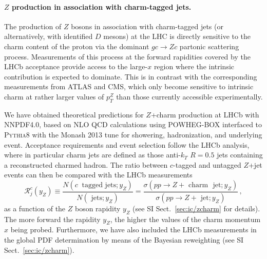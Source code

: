 \paragraph{$Z$ production in association with charm-tagged jets.}
%
The production of $Z$ bosons in association with charm-tagged jets (or alternatively,
with identified $D$ mesons) at the LHC is directly sensitive to the charm content
of the proton via the dominant $gc \to Zc$ partonic scattering process.
%
Measurements of this process at  the forward rapidities covered by the
LHCb acceptance provide access to the large-$x$ region where the intrinsic 
contribution is expected to dominate.
%
This is in contrast with the corresponding measurements from ATLAS and CMS,
which only become sensitive to intrinsic charm
at rather larger values of $p_T^Z$ than those
currently accessible experimentally.

We have obtained  theoretical predictions for $Z$+charm production
at LHCb with NNPDF4.0, based on
NLO QCD calculations using
\textsc{\small POWHEG-BOX} 
interfaced to \textsc{\small Pythia8}
with the Monash 2013 tune for showering,
hadronization, and underlying event.
%
Acceptance requirements and event selection follow the LHCb analysis,
where in particular charm jets are defined as those anti-$k_T$ $R=0.5$ jets
containing a reconstructed charmed hadron.
%
The ratio between $c$-tagged and untagged $Z$+jet events can then
be compared with the LHCb measurements
\begin{equation}
  \mathcal{R}_j^c(y_Z) \equiv \frac{N(c~\textrm{ tagged~jets};y_Z)}{ 
    N(\textrm{ jets};y_Z)} =
  \frac{\sigma(pp\to Z+\textrm{ charm~ jet};y_Z)}{\sigma(pp \to Z+\textrm{ jet};y_Z)} \, ,
\end{equation}
as a function of the $Z$ boson rapidity $y_Z$ (see SI Sect.~\ref{sec:ic/zcharm} for details).
%
The more forward the rapidity $y_{Z}$, the higher the values of the charm
momentum $x$ being probed.
%
Furthermore, we have also included the LHCb measurements in the global PDF
determination by means of the Bayesian reweighting (see SI
Sect.~\ref{sec:ic/zcharm}).

